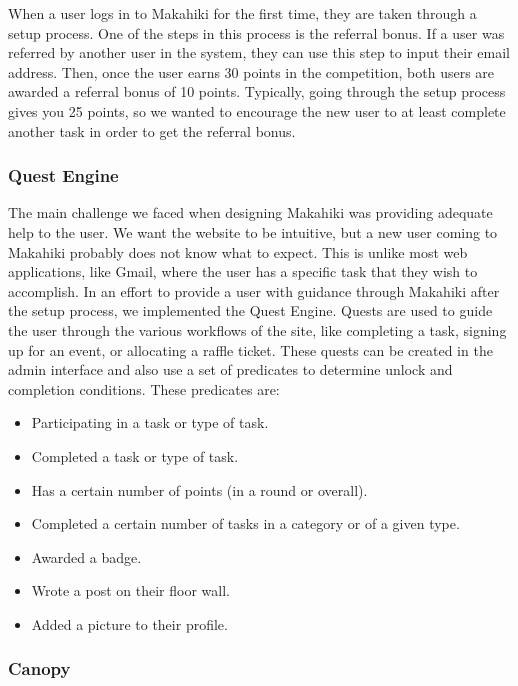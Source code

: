 \documentclass{acm_proc_article-sp}
\begin{document}
When a user logs in to Makahiki for the first time, they are taken through a setup process. One of the steps in this process is the referral bonus. If  a user was referred by another user in the system, they can use this step to input their email address. Then, once the user earns 30 points in the competition, both users are awarded a referral bonus of 10 points. Typically, going through the setup process gives you 25 points, so we wanted to encourage the new user to at least complete another task in order to get the referral bonus.

\subsubsection{Quest Engine}

The main challenge we faced when designing Makahiki was providing adequate help to the user. We want the website to be intuitive, but a new user coming to Makahiki probably does not know what to expect. This is unlike most web applications, like Gmail, where the user has a specific task that they wish to accomplish. In an effort to provide a user with guidance through Makahiki after the setup process, we implemented the Quest Engine. Quests are used to guide the user through the various workflows of the site, like completing a task, signing up for an event, or allocating a raffle ticket. These quests can be created in the admin interface and also use a set of predicates to determine unlock and completion conditions. These predicates are:

\begin{itemize}
  \item Participating in a task or type of task.
  \item Completed a task or type of task.
  \item Has a certain number of points (in a round or overall).
  \item Completed a certain number of tasks in a category or of a given type.
  \item Awarded a badge.
  \item Wrote a post on their floor wall.
  \item Added a picture to their profile.
\end{itemize}

\subsubsection{Canopy}
\end{document}
